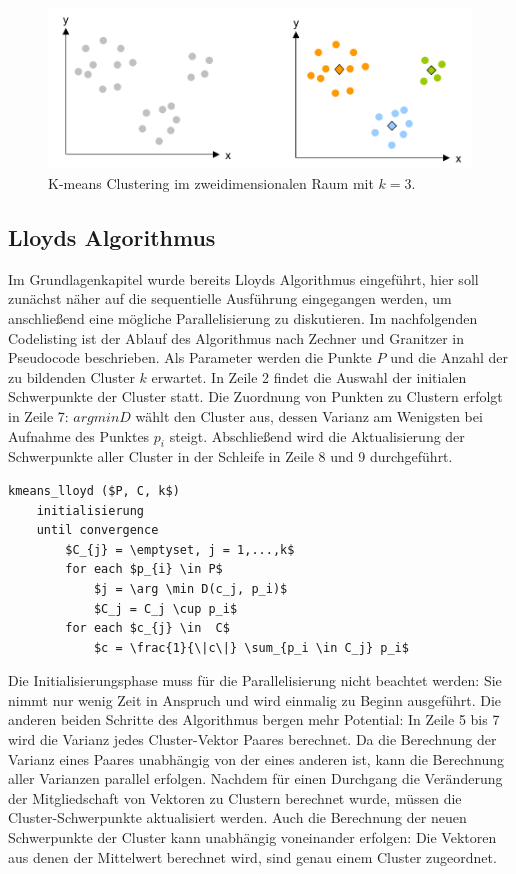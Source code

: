 \begin{figure}
	\centering
	\includegraphics[scale=0.55]{images/kmeans.png}
	\caption{K-means Clustering im zweidimensionalen Raum mit $k = 3$.}
	\label{img:kmeans}
\end{figure}

\subsection{Lloyds Algorithmus}

Im Grundlagenkapitel wurde bereits Lloyds Algorithmus eingeführt, hier soll zunächst näher auf die sequentielle Ausführung eingegangen werden, um anschließend eine mögliche Parallelisierung zu diskutieren. Im nachfolgenden Codelisting ist der Ablauf des Algorithmus nach Zechner und Granitzer \cite{akc2009} in Pseudocode beschrieben. Als Parameter werden die Punkte $P$ und die Anzahl der zu bildenden Cluster $k$ erwartet. In Zeile 2 findet die Auswahl der initialen Schwerpunkte der Cluster statt. Die Zuordnung von Punkten zu Clustern erfolgt in Zeile 7: $argminD$ wählt den Cluster aus, dessen Varianz am Wenigsten bei Aufnahme des Punktes $p_{i}$ steigt. Abschließend wird die Aktualisierung der Schwerpunkte aller Cluster in der Schleife in Zeile 8 und 9 durchgeführt. 

\lstset{language=C}
\begin{lstlisting}[mathescape=true]
kmeans_lloyd ($P, C, k$)
	initialisierung
	until convergence
		$C_{j} = \emptyset, j = 1,...,k$
		for each $p_{i} \in P$
			$j = \arg \min D(c_j, p_i)$	
			$C_j = C_j \cup p_i$	
		for each $c_{j} \in  C$
			$c = \frac{1}{\|c\|} \sum_{p_i \in C_j} p_i$
\end{lstlisting}

Die Initialisierungsphase muss für die Parallelisierung nicht beachtet werden: Sie nimmt nur wenig Zeit in Anspruch und wird einmalig zu Beginn ausgeführt. Die anderen beiden Schritte des Algorithmus bergen mehr Potential: In Zeile 5 bis 7 wird die Varianz jedes Cluster-Vektor Paares berechnet. Da die Berechnung der Varianz eines Paares unabhängig von der eines anderen ist, kann die Berechnung aller Varianzen parallel erfolgen. Nachdem für einen Durchgang die Veränderung der Mitgliedschaft von Vektoren zu Clustern berechnet wurde, müssen die Cluster-Schwerpunkte aktualisiert werden. Auch die Berechnung der neuen Schwerpunkte der Cluster kann unabhängig voneinander erfolgen: Die Vektoren aus denen der Mittelwert berechnet wird, sind genau einem Cluster zugeordnet.

